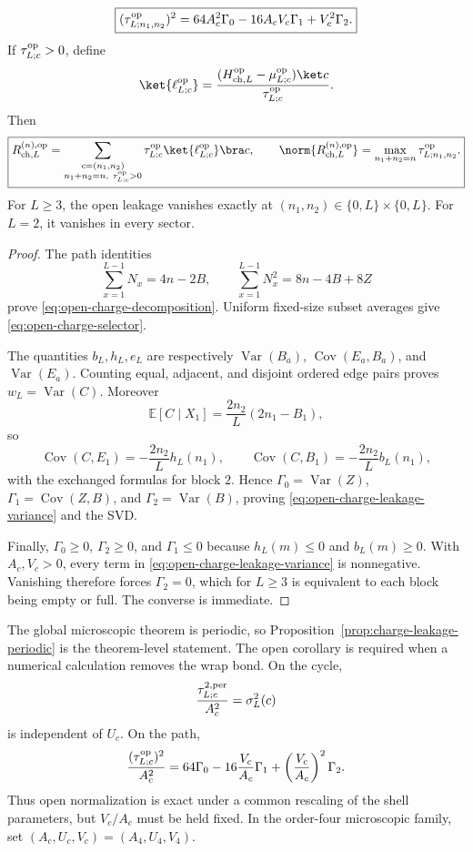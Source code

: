 \begin{corollary}
\begin{equation}
 \boxed{
 (\tau_{L;n_1,n_2}^{\rm op})^2
 =64A_c^2\Gamma_0-16A_cV_c\Gamma_1+V_c^2\Gamma_2.}
 \label{eq:open-charge-leakage-variance}
\end{equation}
If $\tau_{L;c}^{\rm op}>0$, define
\[
 \ket{\ell_{L;c}^{\rm op}}
 =\frac{(H_{{\rm ch},L}^{\rm op}-\mu_{L;c}^{\rm op})\ket c}
 {\tau_{L;c}^{\rm op}}.
\]
Then
\begin{equation}
 \boxed{
 R_{{\rm ch},L}^{(n),\rm op}
 =\sum_{\substack{c=(n_1,n_2)\\n_1+n_2=n,\ \tau_{L;c}^{\rm op}>0}}
 \tau_{L;c}^{\rm op}\ket{\ell_{L;c}^{\rm op}}\bra c,
 \qquad
 \norm{R_{{\rm ch},L}^{(n),\rm op}}
 =\max_{n_1+n_2=n}\tau_{L;n_1,n_2}^{\rm op}.}
 \label{eq:open-charge-leakage-svd}
\end{equation}
For $L\ge3$, the open leakage vanishes exactly at
$(n_1,n_2)\in\{0,L\}\times\{0,L\}$.  For $L=2$, it vanishes in every sector.
\end{corollary}

\begin{proof}
The path identities
\[
 \sum_{x=1}^{L-1}N_x=4n-2B,
 \qquad
 \sum_{x=1}^{L-1}N_x^2=8n-4B+8Z
\]
prove \eqref{eq:open-charge-decomposition}.  Uniform fixed-size subset averages
give \eqref{eq:open-charge-selector}.

The quantities $b_L,h_L,e_L$ are respectively
$\operatorname{Var}(B_a)$, $\operatorname{Cov}(E_a,B_a)$, and
$\operatorname{Var}(E_a)$.  Counting equal, adjacent, and disjoint ordered edge
pairs proves $w_L=\operatorname{Var}(C)$.  Moreover
\[
 \mathbb E[C\mid X_1]=\frac{2n_2}{L}(2n_1-B_1),
\]
so
\[
 \operatorname{Cov}(C,E_1)=-\frac{2n_2}{L}h_L(n_1),
 \qquad
 \operatorname{Cov}(C,B_1)=-\frac{2n_2}{L}b_L(n_1),
\]
with the exchanged formulas for block $2$.  Hence
$\Gamma_0=\operatorname{Var}(Z)$,
$\Gamma_1=\operatorname{Cov}(Z,B)$, and
$\Gamma_2=\operatorname{Var}(B)$, proving
\eqref{eq:open-charge-leakage-variance} and the SVD.

Finally, $\Gamma_0\ge0$, $\Gamma_2\ge0$, and $\Gamma_1\le0$ because
$h_L(m)\le0$ and $b_L(m)\ge0$.  With $A_c,V_c>0$, every term in
\eqref{eq:open-charge-leakage-variance} is nonnegative.  Vanishing therefore
forces $\Gamma_2=0$, which for $L\ge3$ is equivalent to each block being empty
or full.  The converse is immediate.
\end{proof}

\begin{remark}
The global microscopic theorem is periodic, so
Proposition~\ref{prop:charge-leakage-periodic} is the theorem-level statement.
The open corollary is required when a numerical calculation removes the wrap
bond.  On the cycle,
\[
 \frac{\tau_{L;c}^{2,{\rm per}}}{A_c^2}=\sigma_L^2(c)
\]
is independent of $U_c$.  On the path,
\[
 \frac{(\tau_{L;c}^{\rm op})^2}{A_c^2}
 =64\Gamma_0-16\frac{V_c}{A_c}\Gamma_1
 +\left(\frac{V_c}{A_c}\right)^2\Gamma_2.
\]
Thus open normalization is exact under a common rescaling of the shell
parameters, but $V_c/A_c$ must be held fixed.  In the order-four microscopic
family, set $(A_c,U_c,V_c)=(A_4,U_4,V_4)$.
\end{remark}

